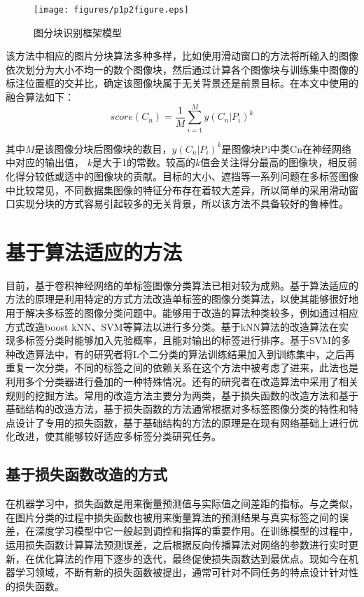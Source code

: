 \begin{figure}[htbp!]
	\centering
	\texttt{[image: figures/p1p2figure.eps]}
	\caption{图分块识别框架模型}\label{fig:simuP1P2Result}
	\vspace{-1em}
\end{figure}

该方法中相应的图片分块算法多种多样，比如使用滑动窗口的方法将所输入的图像依次划分为大小不均一的数个图像块，然后通过计算各个图像块与训练集中图像的标注位置框的交并比，确定该图像块属于无关背景还是前景目标。在本文中使用的融合算法如下：
\begin{equation}
\label{dscNoStgProof0}
score(C_n) = \frac{1}{M}\sum_{i=1}^M y(C_n|P_i)^k
\end{equation}

其中$M$是该图像分块后图像块的数目，$y(C_n|P_i)^k$是图像块Pi中类Cn在神经网络中对应的输出值， $k$是大于1的常数。较高的$k$值会关注得分最高的图像块，相反弱化得分较低或适中的图像块的贡献。目标的大小、遮挡等一系列问题在多标签图像中比较常见，不同数据集图像的特征分布存在着较大差异，所以简单的采用滑动窗口实现分块的方式容易引起较多的无关背景，所以该方法不具备较好的鲁棒性。

\section{基于算法适应的方法}
目前，基于卷积神经网络的单标签图像分类算法已相对较为成熟。基于算法适应的方法的原理是利用特定的方式方法改造单标签的图像分类算法，以使其能够很好地用于解决多标签的图像分类问题中。能够用于改造的算法种类较多，例如通过相应方式改造boost kNN、SVM等算法以进行多分类。基于kNN算法的改造算法在实现多标签分类时能够加入先验概率，且能对输出的标签进行排序。基于SVM的多种改造算法中，有的研究者将L个二分类的算法训练结果加入到训练集中，之后再重复一次分类，不同的标签之间的依赖关系在这个方法中被考虑了进来，此法也是利用多个分类器进行叠加的一种特殊情况。还有的研究者在改造算法中采用了相关规则的挖掘方法。常用的改造方法主要分为两类，基于损失函数的改造方法和基于基础结构的改造方法，基于损失函数的方法通常根据对多标签图像分类的特性和特点设计了专用的损失函数，基于基础结构的方法的原理是在现有网络基础上进行优化改进，使其能够较好适应多标签分类研究任务。

\subsection{基于损失函数改造的方式}
在机器学习中，损失函数是用来衡量预测值与实际值之间差距的指标。与之类似，在图片分类的过程中损失函数也被用来衡量算法的预测结果与真实标签之间的误差，在深度学习模型中它一般起到调控和指挥的重要作用。在训练模型的过程中，运用损失函数计算算法预测误差，之后根据反向传播算法对网络的参数进行实时更新，在优化算法的作用下逐步的迭代，最终促使损失函数达到最优点。现如今在机器学习领域，不断有新的损失函数被提出，通常可针对不同任务的特点设计针对性的损失函数。

